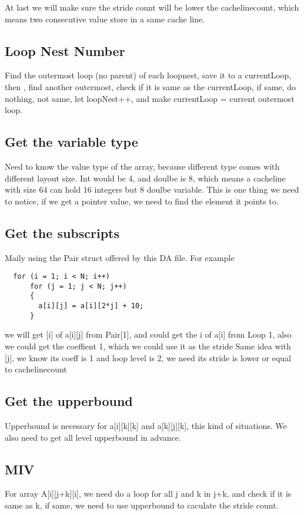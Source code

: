 At last we will make sure the stride count will be lower the
cachelinecount, which means two consecutive value store in  a same
cache line.

\subsection{Loop Nest Number} 
Find the outermost loop (no parent) of each loopnest, save it to a
currentLoop, then , find another outermost, check if it is same as the
currentLoop, if same, do nothing, not same, let loopNest++, and make
currentLoop = current outermost loop.

\subsection{Get the variable type} 
Need to know the value type of the array, because different type comes
with different layout size. Int would be 4, and doulbe is 8, which
means a cacheline with size 64 can hold 16 integers but 8 doulbe variable. 
This is one thing we need to notice, if we get a pointer value, we
need to find the element it points to.

\subsection{Get the subscripts} 
   Maily using the Pair struct offered by this DA file. For example 
\begin{lstlisting}
  for (i = 1; i < N; i++)
      for (j = 1; j < N; j++)
      {
        a[i][j] = a[i][2*j] + 10;
      }

\end{lstlisting}
we will get [i] of a[i][j] from Pair[1], and could get the i of a[i]
from Loop 1, also we could get the coeffient 1, which we could use it
as the stride Same idea with [j], we know its coeff is 1 and loop
level is 2, we need its stride is lower or equal to cachelinecount 

\subsection{Get the upperbound}
Upperbound is necessary for a[i][k][k] and a[k][j][k], this kind of
situations. We also need to get all level upperbound in advance.

\subsection{MIV} 
For array A[i][j+k][i], we need do a loop for all j and k in j+k, and
check if it is same as k, if same, we need to use upperbound to
caculate the stride count. 


